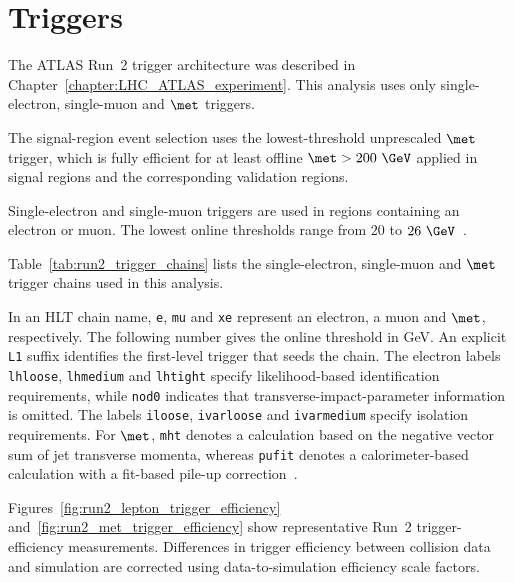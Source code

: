 \section{Triggers}
\label{sec:analysis_triggers}

The ATLAS Run~2 trigger architecture was described in Chapter~\ref{chapter:LHC_ATLAS_experiment}.
This analysis uses only single-electron, single-muon and $\met$ triggers.

The signal-region event selection uses the lowest-threshold unprescaled $\met$ trigger, which is fully efficient for at least offline $\met>200~\GeV$ applied in signal regions and the corresponding validation regions.

Single-electron and single-muon triggers are used in regions containing an electron or muon.
The lowest online thresholds range from $20$ to $26~\GeV$~\cite{ATLASElectronTriggerRun2,ATLASMuonTriggerRun2}.

Table~\ref{tab:run2_trigger_chains} lists the single-electron, single-muon and $\met$ trigger chains used in this analysis.

In an HLT chain name, \texttt{e}, \texttt{mu} and \texttt{xe} represent an electron, a muon and $\met$, respectively. The following number gives the online threshold in GeV.
An explicit \texttt{L1} suffix identifies the first-level trigger that seeds the chain.
The electron labels \texttt{lhloose}, \texttt{lhmedium} and \texttt{lhtight} specify likelihood-based identification requirements, while \texttt{nod0} indicates that transverse-impact-parameter information is omitted.
The labels \texttt{iloose}, \texttt{ivarloose} and \texttt{ivarmedium} specify isolation requirements.
For $\met$, \texttt{mht} denotes a calculation based on the negative vector sum of jet transverse momenta, whereas \texttt{pufit} denotes a calorimeter-based calculation with a fit-based pile-up correction~\cite{ATLASMETTriggerRun2}.

Figures~\ref{fig:run2_lepton_trigger_efficiency} and~\ref{fig:run2_met_trigger_efficiency} show representative Run~2 trigger-efficiency measurements.
Differences in trigger efficiency between collision data and simulation are corrected using data-to-simulation efficiency scale factors.


